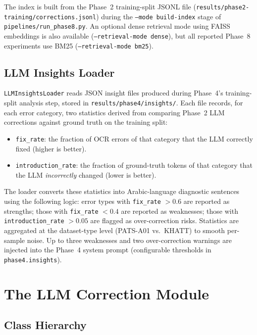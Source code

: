 The index is built from the Phase~2 training-split JSONL file
(\texttt{results/phase2-training/corrections.jsonl}) during the
\texttt{--mode build-index} stage of \texttt{pipelines/run\_phase8.py}.
An optional dense retrieval mode using FAISS embeddings is also available
(\texttt{--retrieval-mode dense}), but all reported Phase~8 experiments use
BM25 (\texttt{--retrieval-mode bm25}).

\subsection{LLM Insights Loader}
\label{subsec:kb_insights}

\texttt{LLMInsightsLoader} reads JSON insight files produced during Phase~4's
training-split analysis step, stored in \texttt{results/phase4/insights/}.
Each file records, for each error category, two statistics derived from comparing
Phase~2 LLM corrections against ground truth on the training split:
\begin{itemize}
  \item \texttt{fix\_rate}: the fraction of OCR errors of that category that
        the LLM correctly fixed (higher is better).
  \item \texttt{introduction\_rate}: the fraction of ground-truth tokens of that
        category that the LLM \emph{incorrectly} changed (lower is better).
\end{itemize}
The loader converts these statistics into Arabic-language diagnostic sentences
using the following logic:
error types with \texttt{fix\_rate} $> 0.6$ are reported as strengths;
those with \texttt{fix\_rate} $< 0.4$ are reported as weaknesses;
those with \texttt{introduction\_rate} $> 0.05$ are flagged as over-correction
risks.
Statistics are aggregated at the dataset-type level (PATS-A01 vs.\ KHATT) to
smooth per-sample noise.
Up to three weaknesses and two over-correction warnings are injected into the
Phase~4 system prompt (configurable thresholds in \texttt{phase4.insights}).

\section{The LLM Correction Module}
\label{sec:llm_module}

\subsection{Class Hierarchy}
\label{subsec:corrector_arch}


